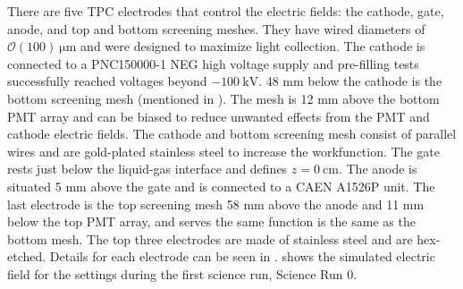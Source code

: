 There are five TPC electrodes that control the electric fields: the cathode, gate, anode, and top and bottom screening meshes.  They have
wired diameters of $\mathcal{O}(100)\ \mathrm{\mu m}$ and were designed to maximize light collection.  The cathode is connected to a
PNC150000-1 NEG high voltage supply and pre-filling tests successfully reached voltages beyond $-100\ \mathrm{kV}$.  48
mm below the cathode is the bottom screening mesh (mentioned in ).  The mesh is 12 mm above the bottom PMT
array and can be biased to reduce unwanted effects from the PMT and cathode electric fields.  The cathode and bottom screening mesh
consist of
parallel wires and are gold-plated stainless steel to increase the workfunction.  The gate rests just below the
liquid-gas interface and defines $z = 0\ \mathrm{cm}$.  The anode is
situated 5 mm above the gate and is connected to a CAEN A1526P unit.  The last electrode is the top screening mesh 58 mm above
the anode and 11 mm below the top PMT array, and serves the same function is the same as the bottom mesh.  The top three electrodes are
made of stainless steel and are hex-etched.  Details for each electrode can be seen in
.   shows the simulated electric field for the settings during the first
science run, Science Run 0.

\bgroup
\def\arraystretch{1.2}
\begin{table}
\centering
{}
\caption{Properties for TPC electrodes.  The cathode and bottom screening mesh have high transparency to optimize S1 light collection and
are gold-plated to decrease the risk of photoionization.}
\label{tab:xenon1t_tpc_electrodes}
\end{table}

